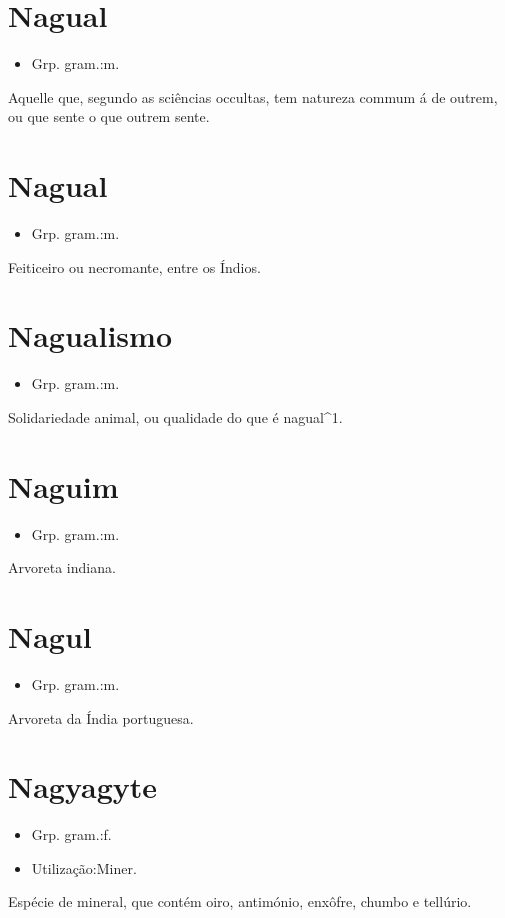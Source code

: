 \section{Nagual}
\begin{itemize}
\item {Grp. gram.:m.}
\end{itemize}
Aquelle que, segundo as sciências occultas, tem natureza commum á de outrem, ou que sente o que outrem sente.
\section{Nagual}
\begin{itemize}
\item {Grp. gram.:m.}
\end{itemize}
Feiticeiro ou necromante, entre os Índios.
\section{Nagualismo}
\begin{itemize}
\item {Grp. gram.:m.}
\end{itemize}
Solidariedade animal, ou qualidade do que é \textunderscore nagual\textunderscore ^1.
\section{Naguim}
\begin{itemize}
\item {Grp. gram.:m.}
\end{itemize}
Arvoreta indiana.
\section{Nagul}
\begin{itemize}
\item {Grp. gram.:m.}
\end{itemize}
Arvoreta da Índia portuguesa.
\section{Nagyagyte}
\begin{itemize}
\item {Grp. gram.:f.}
\end{itemize}
\begin{itemize}
\item {Utilização:Miner.}
\end{itemize}
Espécie de mineral, que contém oiro, antimónio, enxôfre, chumbo e tellúrio.

